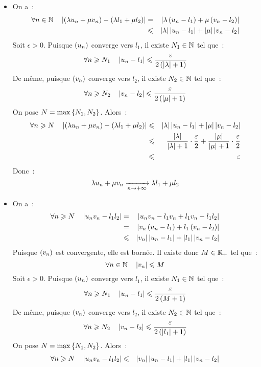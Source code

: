 \documentclass{magnolia}
\begin{document}
\begin{preuve}
$\quad$
\begin{itemize}
\item On a~:
  \begin{eqnarray*}
  \forall n\in\mathbb{N} \quad \left|\left(\lambda u_n+ \mu v_n\right)-\left(\lambda l_1+\mu l_2\right)\right|
  &=& \left|\lambda\left(u_n-l_1\right)+\mu\left(v_n-l_2\right)\right|\\
  &\leqslant& \left|\lambda\right|\left|u_n-l_1\right| + \left|\mu\right|\left|v_n-l_2\right|
  \end{eqnarray*}
  Soit $\epsilon>0$. Puisque $\left(u_n\right)$ converge vers $l_1$, il existe $N_1\in\mathbb{N}$
  tel que~:
  \[\forall n\geqslant N_1 \quad \left|u_n-l_1\right|\leqslant
    \frac{\varepsilon}{2\left(\left|\lambda\right|+1\right)}\]
  De même, puisque $\left(v_n\right)$ converge vers $l_2$, il existe $N_2\in\mathbb{N}$ tel que~:
  \[\forall n\geqslant N_2 \quad \left|v_n-l_2\right|\leqslant
    \frac{\varepsilon}{2\left(\left|\mu\right|+1\right)}\]
  On pose $N=\max\left\{N_1,N_2\right\}$. Alors~:
  \begin{eqnarray*}
  \forall n\geqslant N \quad \left|\left(\lambda u_n+ \mu v_n\right)-\left(\lambda l_1+\mu l_2\right)\right|
  &\leqslant& \left|\lambda\right|\left|u_n-l_1\right| + \left|\mu\right|\left|v_n-l_2\right|\\
  &\leqslant& \frac{\left|\lambda\right|}{\left|\lambda\right|+1}\cdot\frac{\varepsilon}{2}+
         \frac{\left|\mu\right|}{\left|\mu\right|+1}\cdot\frac{\varepsilon}{2}\\
  &\leqslant& \varepsilon
  \end{eqnarray*}
  Donc~:
  \[\lambda u_n+\mu v_n \xrightarrow[n\rightarrow +\infty]{} \lambda l_1+\mu l_2\]
\item On a~:
  \begin{eqnarray*}
  \forall n\geqslant N \quad \left|u_n v_n - l_1 l_2\right|
  &=& \left|u_n v_n - l_1 v_n + l_1 v_n - l_1 l_2\right|\\
  &=& \left|v_n\left(u_n-l_1\right)+l_1\left(v_n-l_2\right)\right|\\
  &\leqslant& \left|v_n\right|\left|u_n-l_1\right|+\left|l_1\right|\left|v_n-l_2\right|
  \end{eqnarray*}
  Puisque $\left(v_n\right)$ est convergente, elle est bornée. Il existe donc
  $M\in\mathbb{R}_+$ tel que~:
  \[\forall n\in\mathbb{N} \quad \left|v_n\right|\leqslant M\]
  Soit $\epsilon>0$. Puisque $\left(u_n\right)$ converge vers $l_1$, il existe $N_1\in\mathbb{N}$
  tel que~:
  \[\forall n\geqslant N_1 \quad \left|u_n-l_1\right|\leqslant\frac{\varepsilon}{2\left(M+1\right)}\]
  De même, puisque $\left(v_n\right)$ converge vers $l_2$, il existe $N_2\in\mathbb{N}$ tel que~:
  \[\forall n\geqslant N_2 \quad \left|v_n-l_2\right|\leqslant\frac{\varepsilon}{2\left(\left|l_1\right|+1\right)}\]
  On pose $N=\max\left\{N_1,N_2\right\}$. Alors~:
  \begin{eqnarray*}
  \forall n\geq N \quad \abs{u_n v_n - l_1 l_2}
  &\leq& \abs{v_n}\abs{u_n-l_1}+\abs{l_1}\abs{v_n-l_2}\\

\end{eqnarray*}
\end{itemize}
\end{preuve}
\end{document}
